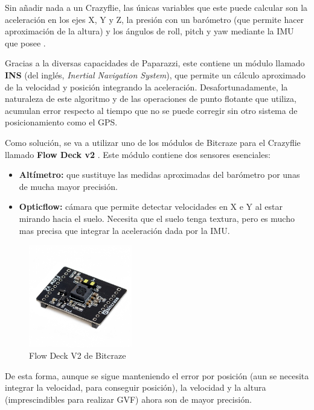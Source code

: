 Sin añadir nada a un Crazyflie, las únicas variables que este puede calcular son la aceleración en los ejes X, Y y Z, 
la presión con un barómetro (que permite hacer aproximación de la altura) y
los ángulos de roll, pitch y yaw mediante la IMU que posee \cite{imu-wikipedia}. 

Gracias a la diversas capacidades de Paparazzi, este contiene un módulo llamado \textbf{INS} (del inglés, \textit{Inertial Navigation System}), 
que permite un cálculo aproximado de la velocidad y posición integrando la aceleración.
Desafortunadamente, la naturaleza de este algoritmo y de las operaciones de punto flotante que utiliza, 
acumulan error respecto al tiempo que no se puede corregir sin otro sistema de posicionamiento como el GPS.

Como solución, se va a utilizar uno de los módulos de Bitcraze para el Crazyflie llamado \textbf{Flow Deck v2} \cite{flow-deck}.
Este módulo contiene dos sensores esenciales: 

\begin{itemize}
    \item \textbf{Altímetro:} que sustituye las medidas aproximadas del barómetro por unas de mucha mayor precisión.
    \item \textbf{Opticflow:} cámara que permite detectar velocidades en X e Y al estar mirando hacia el suelo. Necesita que el suelo tenga textura, pero es mucho mas precisa que integrar la aceleración dada por la IMU.
\end{itemize}

\begin{figure}[h]
    \centering
    \includegraphics[width=0.4\textwidth]{img/fig/fig3.4-flow-deck.jpg}
    \caption{Flow Deck V2 de Bitcraze}
    \label{fig:flow-deck}
\end{figure}

De esta forma, aunque se sigue manteniendo el error por posición (aun se necesita integrar la velocidad, para conseguir posición),
la velocidad y la altura (imprescindibles para realizar GVF) ahora son de mayor precisión.


